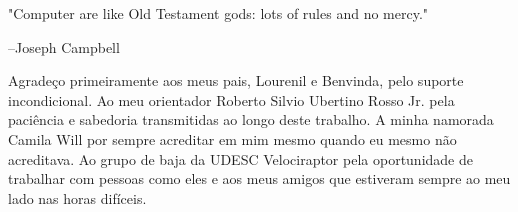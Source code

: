 
\bacharelado {}
\data {\today}





\newpage
\pagestyle{empty}

\maketitle
 \begin{epigrafe}
\noindent "Computer are like Old Testament gods: lots of rules and no mercy."

--Joseph Campbell
\end{epigrafe}

Agradeço primeiramente aos meus pais, Lourenil e Benvinda, pelo suporte incondicional. Ao meu orientador Roberto Silvio Ubertino Rosso Jr. pela paciência e sabedoria transmitidas ao longo deste trabalho. A minha namorada Camila Will por sempre acreditar em mim mesmo quando eu mesmo não acreditava. Ao grupo de baja da UDESC Velociraptor pela oportunidade de trabalhar com pessoas como eles e aos meus amigos que estiveram sempre ao meu lado nas horas difíceis.   